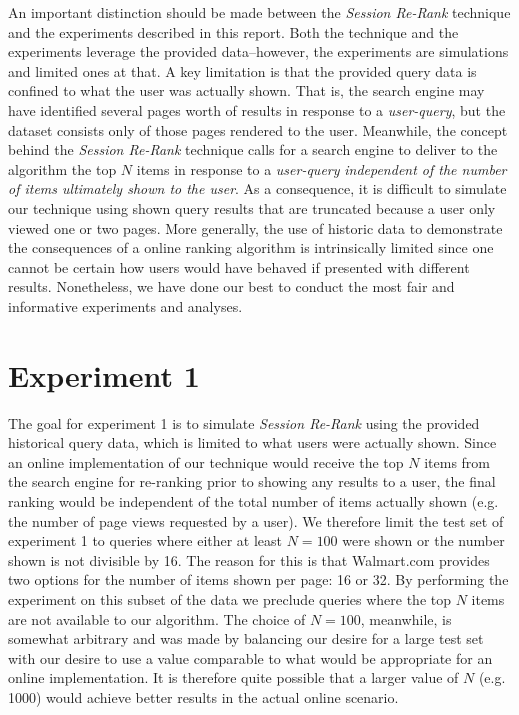 \documentclass{article}
\begin{document}
An important distinction should be made between the {\em Session Re-Rank}
technique and the experiments described in this report. Both the technique and
the experiments leverage the provided data--however, the experiments are
simulations and limited ones at that. A key limitation is that the provided
query data is confined to what the user was actually shown. That is, the search
engine may have identified several pages worth of results in response to a {\em
user-query}, but the dataset consists only of those pages rendered to the user.
Meanwhile, the concept behind the {\em Session Re-Rank} technique calls for a
search engine to deliver to the algorithm the top $N$ items in response to a
{\em user-query} {\em independent of the number of items ultimately shown to the
user}. As a consequence, it is difficult to simulate our technique using shown
query results that are truncated because a user only viewed one or two pages. 
More generally, the use of historic data to demonstrate the consequences of a 
online ranking algorithm is intrinsically limited since one cannot be certain 
how users would have behaved if presented with different results. Nonetheless, 
we have done our best to conduct the most fair and informative experiments and 
analyses.

\section{Experiment 1}

The goal for experiment 1 is to simulate {\em Session Re-Rank} using the
provided historical query data, which is limited to what users were actually
shown. Since an online implementation of our technique would receive the top $N$
items from the search engine for re-ranking prior to showing any results to a
user, the final ranking would be independent of the total number of items
actually shown (e.g. the number of page views requested by a user). We therefore
limit the test set of experiment 1 to queries where either at least $N=100$ were
shown or the number shown is not divisible by 16. The reason for this is that
Walmart.com provides two options for the number of items shown per page: 16 or
32. By performing the experiment on this subset of the data we preclude queries
where the top $N$ items are not available to our algorithm. The choice of
$N=100$, meanwhile, is somewhat arbitrary and was made by balancing our desire
for a large test set with our desire to use a value comparable to what would be
appropriate for an online implementation. It is therefore quite possible that a
larger value of $N$ (e.g. 1000) would achieve better results in the actual
online scenario.
\end{document}
